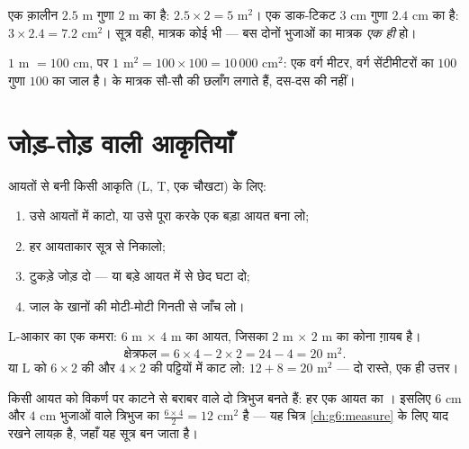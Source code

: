 \begin{example}\label{ex:g5:areas:rectangle}
एक क़ालीन $2.5$ m गुणा $2$ m का है: 
$2.5 \times 2 = 5$ m$^2$। एक डाक-टिकट $3$ cm गुणा $2.4$ cm का
है:  $3 \times 2.4 = 7.2$ cm$^2$। सूत्र वही, मात्रक कोई
भी --- बस दोनों भुजाओं का मात्रक \emph{एक ही} हो।
\end{example}

\begin{example}[वर्ग मात्रक सौ के हिसाब से बदलते हैं]\label{ex:g5:areas:units}
$1$ m $= 100$ cm, पर $1$ m$^2 = 100 \times 100 = 10\,000$ cm$^2$:
एक वर्ग मीटर, वर्ग सेंटीमीटरों का $100$ गुणा $100$ का जाल है।
 के मात्रक सौ-सौ की छलाँग लगाते हैं, दस-दस की नहीं।
\end{example}

\section{जोड़-तोड़ वाली आकृतियाँ}

\begin{method}[काटो, जोड़ो, घटाओ]\label{met:g5:areas:composite}
आयतों से बनी किसी आकृति (L, T, एक चौखटा) के लिए:
\begin{enumerate}
  \item उसे आयतों में काटो, या उसे पूरा करके एक बड़ा आयत बना लो;
  \item हर आयताकार  सूत्र से निकालो;
  \item टुकड़े जोड़ दो --- या बड़े आयत में से छेद घटा दो;
  \item जाल के खानों की मोटी-मोटी गिनती से जाँच लो।
\end{enumerate}
\end{method}

\begin{example}\label{ex:g5:areas:composite}
L-आकार का एक कमरा: $6$ m $\times$ $4$ m का आयत, जिसका
$2$ m $\times$ $2$ m का कोना ग़ायब है।
\[
\text{क्षेत्रफल} = 6 \times 4 - 2 \times 2 = 24 - 4 = 20 \text{ m}^2 .
\]
या L को $6 \times 2$ की और $4 \times 2$ की पट्टियों में काट लो:
$12 + 8 = 20$ m$^2$ --- दो रास्ते, एक ही उत्तर।
\end{example}

\begin{example}[आयत का आधा]\label{ex:g5:areas:halfrect}
किसी आयत को विकर्ण पर काटने से बराबर  वाले दो त्रिभुज
बनते हैं: हर एक आयत का \emph{}। इसलिए $6$ cm और $4$ cm
भुजाओं वाले  त्रिभुज का 
$\frac{6 \times 4}{2} = 12$ cm$^2$ है --- यह चित्र
\cref{ch:g6:measure} के लिए याद रखने लायक़ है, जहाँ यह सूत्र बन जाता है।
\end{example}

